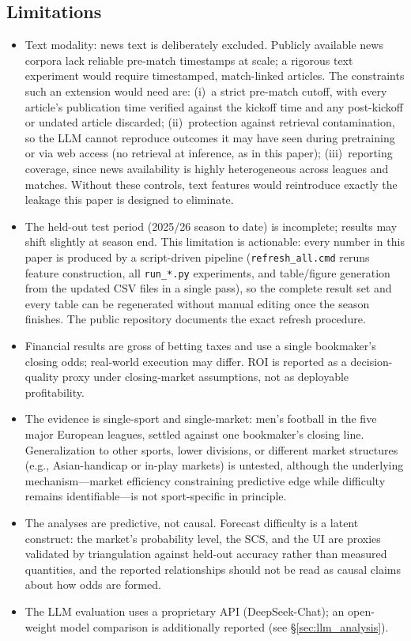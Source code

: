 \subsection{Limitations}
\begin{itemize}
\item Text modality: news text is deliberately excluded. Publicly
available news corpora lack reliable pre-match timestamps at scale;
a rigorous text experiment would require timestamped, match-linked
articles. The constraints such an extension would need are:
(i)~a strict pre-match cutoff, with every article's publication time
verified against the kickoff time and any post-kickoff or undated
article discarded; (ii)~protection against retrieval contamination, so
the LLM cannot reproduce outcomes it may have seen during pretraining
or via web access (no retrieval at inference, as in this paper);
(iii)~reporting coverage, since news availability is highly
heterogeneous across leagues and matches. Without these controls,
text features would reintroduce exactly the leakage this paper is
designed to eliminate.
\item The held-out test period (2025/26 season to date) is
incomplete; results may shift
slightly at season end. This limitation is actionable: every number in
this paper is produced by a script-driven pipeline
(\texttt{refresh\_all.cmd} reruns feature construction, all
\texttt{run\_*.py} experiments, and table/figure generation from the
updated CSV files in a single pass), so the complete result set and
every table can be regenerated without manual editing once the season
finishes. The public repository documents the exact refresh procedure.
\item Financial results are gross of betting taxes and use a single
bookmaker's closing odds; real-world execution may differ. ROI is
reported as a decision-quality proxy under closing-market
assumptions, not as deployable profitability.
\item The evidence is single-sport and single-market: men's football
in the five major European leagues, settled against one bookmaker's
closing line. Generalization to other sports, lower divisions, or
different market structures (e.g., Asian-handicap or in-play
markets) is untested, although the underlying mechanism---market
efficiency constraining predictive edge while difficulty remains
identifiable---is not sport-specific in principle.
\item The analyses are predictive, not causal. Forecast difficulty
is a latent construct: the market's probability level, the SCS, and
the UI are proxies validated by triangulation against held-out
accuracy rather than measured quantities, and the reported
relationships should not be read as causal claims about how odds are
formed.
\item The LLM evaluation uses a proprietary API (DeepSeek-Chat);
an open-weight model comparison is additionally reported
(see \S\ref{sec:llm_analysis}).
\end{itemize}
